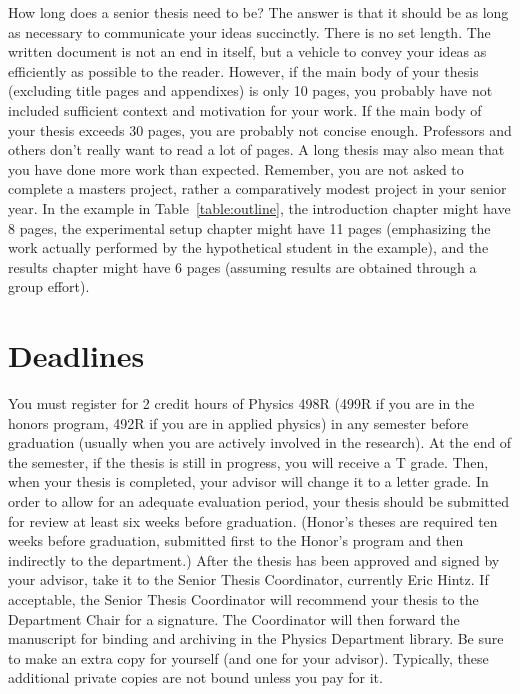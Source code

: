 How long does a senior thesis need to be? The answer is that it
should be as long as necessary to communicate your ideas succinctly.
There is no set length. The written document is not an end in
itself, but a vehicle to convey your ideas as efficiently as
possible to the reader. However, if the main body of your thesis
(excluding title pages and appendixes) is only 10 pages, you
probably have not included sufficient context and motivation for
your work. If the main body of your thesis exceeds 30 pages, you are
probably not concise enough. Professors and others don't really want
to read a lot of pages. A long thesis may also mean that you have
done more work than expected. Remember, you are not asked to
complete a masters project, rather a comparatively modest project in
your senior year. In the example in Table~\ref{table:outline}, the
introduction chapter might have 8 pages, the experimental setup
chapter might have 11 pages (emphasizing the work actually performed
by the hypothetical student in the example), and the results chapter
might have 6 pages (assuming results are obtained through a group
effort).

\section{Deadlines}
\label{sec:Deadlines} 

You must register for 2 credit hours of Physics 498R (499R if you
are in the honors program, 492R if you are in applied physics) in
any semester before graduation (usually when you are actively
involved in the research). At the end of the semester, if the thesis
is still in progress, you will receive a T grade. Then, when your
thesis is completed, your advisor will change it to a letter grade.
In order to allow for an adequate evaluation period, your thesis
should be submitted for review at least six weeks before graduation.
(Honor's theses are required ten weeks before graduation, submitted
first to the Honor's program and then indirectly to the department.)
After the thesis has been approved and signed by your advisor, take
it to the Senior Thesis Coordinator, currently Eric Hintz. If
acceptable, the Senior Thesis Coordinator will recommend your thesis
to the Department Chair for a signature. The Coordinator will then
forward the manuscript for binding and archiving in the Physics
Department library. Be sure to make an extra copy for yourself (and
one for your advisor). Typically, these additional private copies
are not bound unless you pay for it.

